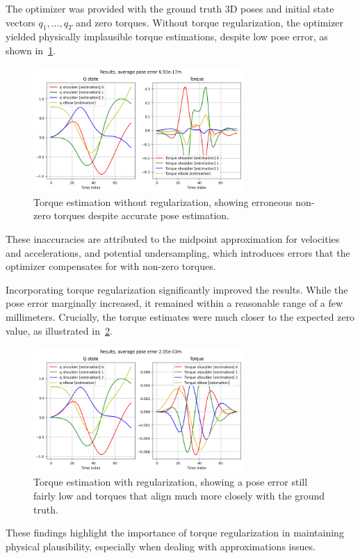 The optimizer was provided with the ground truth 3D poses and initial state vectors \(q_1, \ldots, q_T\) and zero torques. Without torque 
regularization, the optimizer yielded physically implausible torque estimations, despite low pose error, as shown 
in~\cref{fig:free_fall_no_torque}.

\begin{figure}
    \centering
    \includegraphics[width=8cm]{figures/free_fall_no_torque.png}
    \caption{Torque estimation without regularization, showing erroneous non-zero torques despite accurate pose estimation.}
    \label{fig:free_fall_no_torque}
\end{figure}

These inaccuracies are attributed to the midpoint approximation for velocities and accelerations, and potential undersampling, which 
introduces errors that the optimizer compensates for with non-zero torques.

Incorporating torque regularization significantly improved the results. While the pose error marginally increased, it remained within a 
reasonable range of a few millimeters. Crucially, the torque estimates were much closer to the expected zero value, as illustrated 
in~\cref{fig:free_fall_torque}.

\begin{figure}
    \centering
    \includegraphics[width=8cm]{figures/free_fall_torque.png}
    \caption{Torque estimation with regularization, showing a pose error still fairly low and torques that align much more closely with the ground truth.}
    \label{fig:free_fall_torque}
\end{figure}

These findings highlight the importance of torque regularization in maintaining physical plausibility, especially when dealing with 
approximations issues.
